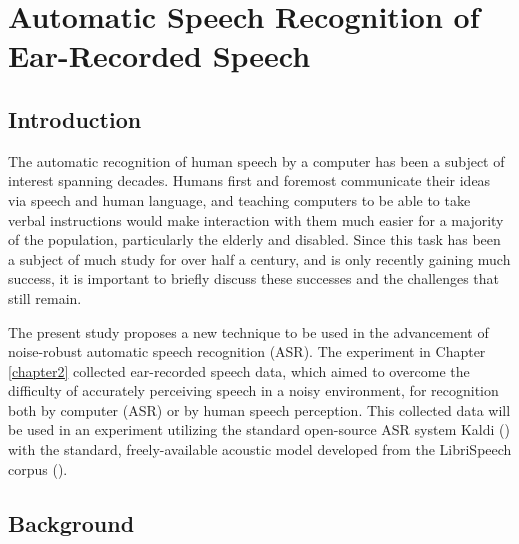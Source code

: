  



\chapter{Automatic Speech Recognition of Ear-Recorded Speech\DIFdelbegin %
\DIFdelend \DIFaddbegin \label{chapter4}\DIFaddend }


\section{Introduction}\DIFaddbegin \label{chap4:introduction}
\DIFaddend 

The automatic recognition of human speech by a computer has been a subject of interest spanning decades.  Humans first and foremost communicate their ideas via speech and human language, and teaching computers to be able to take verbal instructions would make interaction with them much easier for a majority of the population, particularly the elderly and disabled.  Since this task has been a subject of much study for over half a century, and is only recently gaining much success, it is important to briefly discuss these successes and the challenges that still remain.


The present study proposes a new technique to be used in the advancement of noise-robust automatic speech recognition (ASR).
The experiment in Chapter \DIFdelbegin {}\DIFdelend \ref{chapter2} collected ear-recorded speech data, which aimed to overcome the difficulty of accurately perceiving speech in a noisy environment, for recognition both by computer (ASR) or by human speech perception.  This collected data will be used in an experiment utilizing the standard open-source ASR system Kaldi (\cite{povey:11}) with the standard, freely-available acoustic model developed from the LibriSpeech corpus (\cite{panayotov:15}).

\section{Background}
\DIFdelbegin %
\DIFdelend \DIFaddbegin \label{chap4:background}
\DIFaddend 

